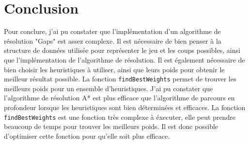 \chapter{Conclusion}
Pour conclure, j'ai pu constater que l'implémentation d'un algorithme de résolution "Gaps" est assez complexe. Il est nécessaire de bien penser à la structure de données utilisée pour représenter le jeu et les coups possibles, ainsi que l'implémentation de l'algorithme de résolution. Il est également nécessaire de bien choisir les heuristiques à utiliser, ainsi que leurs poids pour obtenir le meilleur résultat possible. La fonction \texttt{findBestWeights} permet de trouver les meilleurs poids pour un ensemble d'heuristiques. J'ai pu constater que l'algorithme de résolution A* est plus efficace que l'algorithme de parcours en profondeur lorsque les heuristiques sont bien déterminées et efficaces. La fonction \texttt{findBestWeights} est une fonction très complexe à éxecuter, elle peut prendre beaucoup de temps pour trouver les meilleurs poids. Il est donc possible d'optimiser cette fonction pour qu'elle soit plus efficace.